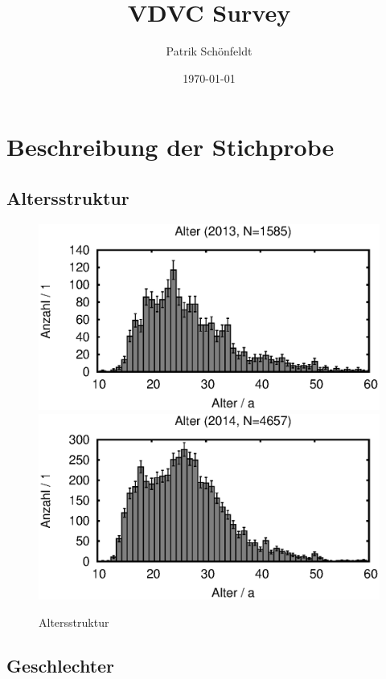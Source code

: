 \documentclass[11pt]{scrartcl}
\title{VDVC Survey}
\author{Patrik Schönfeldt}
\date{\today}
\begin{document}
\maketitle

\newpage
\section{Beschreibung der Stichprobe}
\subsection{Altersstruktur}

\begin{figure}[htbp]
   \centering
   \includegraphics[width=0.8\linewidth]{2013/alter}\\
   \includegraphics[width=0.8\linewidth]{2014/alter}
   \caption{Altersstruktur}
   \label{fig:alter}
\end{figure}

\clearpage
\subsection{Geschlechter}
\end{document}
